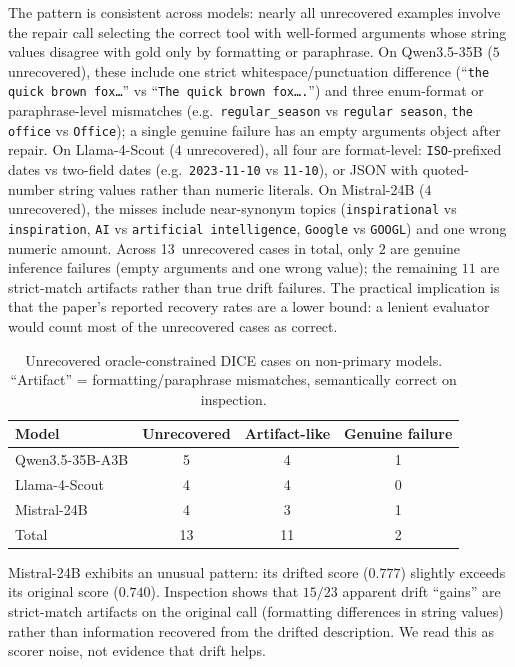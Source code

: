 \documentclass{llncs}
\begin{document}
The pattern is consistent across models: nearly all unrecovered examples
involve the repair call selecting the correct tool with well-formed arguments
whose string values disagree with gold only by formatting or paraphrase. On
Qwen3.5-35B ($5$ unrecovered), these include one strict whitespace/punctuation
difference (``\texttt{the quick brown fox\ldots}'' vs
``\texttt{The quick brown fox\ldots.}'') and three enum-format or
paraphrase-level mismatches (e.g.\ \texttt{regular\_season} vs
\texttt{regular season}, \texttt{the office} vs \texttt{Office}); a single
genuine failure has an empty arguments object after repair. On Llama-4-Scout
($4$ unrecovered), all four are format-level: \texttt{ISO}-prefixed dates
vs two-field dates (e.g.\ \texttt{2023-11-10} vs \texttt{11-10}), or JSON
with quoted-number string values rather than numeric literals. On Mistral-24B
($4$ unrecovered), the misses include near-synonym topics (\texttt{inspirational}
vs \texttt{inspiration}, \texttt{AI} vs \texttt{artificial intelligence},
\texttt{Google} vs \texttt{GOOGL}) and one wrong numeric amount. Across
13~unrecovered cases in total, only $2$ are genuine inference failures
(empty arguments and one wrong value); the remaining $11$ are strict-match
artifacts rather than true drift failures. The practical implication is that
the paper's reported recovery rates are a lower bound: a lenient evaluator
would count most of the unrecovered cases as correct.

\begin{table}[t]
\caption{Unrecovered oracle-constrained DICE cases on non-primary models.
``Artifact'' = formatting/paraphrase mismatches, semantically correct on inspection.}
\label{tab:unrecovered-summary}
\centering
\small
\begin{tabular}{lccc}
\toprule
Model & Unrecovered & Artifact-like & Genuine failure \\
\midrule
Qwen3.5-35B-A3B & 5 & 4 & 1 \\
Llama-4-Scout   & 4 & 4 & 0 \\
Mistral-24B     & 4 & 3 & 1 \\
\midrule
Total           & 13 & 11 & 2 \\
\bottomrule
\end{tabular}
\end{table}

Mistral-24B exhibits an unusual pattern: its drifted score ($0.777$) slightly
exceeds its original score ($0.740$). Inspection shows that $15/23$ apparent
drift ``gains'' are strict-match artifacts on the original call (formatting
differences in string values) rather than information recovered from the drifted
description. We read this as scorer noise, not evidence that drift helps.
\end{document}
